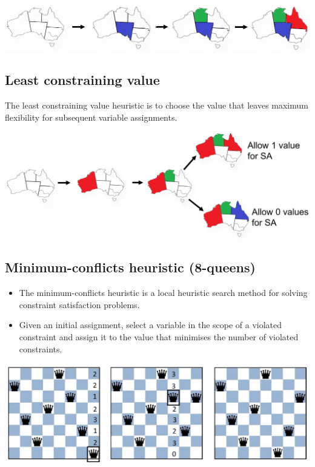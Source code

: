 \documentclass[11pt]{article}
\begin{document}
\begin{center}
\includegraphics[width=.9\linewidth]{./images/most-contrained-variable-map-colouring-example.png}
\end{center}

 \newpage
\subsection{Least constraining value}
\label{sec:orgb5ad572}
The least constraining value heuristic is to choose the value that leaves maximum flexibility for subsequent variable assignments.

\begin{center}
\includegraphics[width=.9\linewidth]{./images/least-constraining-value-map-colouring-example.png}
\end{center}
\subsection{Minimum-conflicts heuristic (8-queens)}
\label{sec:org5add920}
\begin{itemize}
\item The minimum-conflicts heuristic is a local heuristic search method for solving constraint satisfaction problems.
\item Given an initial assignment, select a variable in the scope of a violated constraint and assign it to the value that minimises the number of violated constraints.
\end{itemize}

\begin{center}
\includegraphics[width=.9\linewidth]{./images/minimum-conflicts-heuristic-8-queens-example.png}
\end{center}
\end{document}
